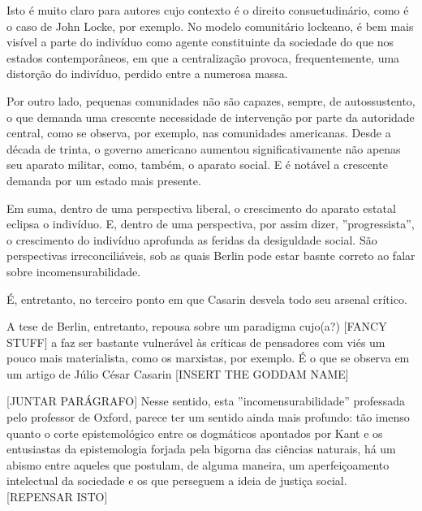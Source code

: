 \documentclass[12pt,a4paper]{article}
\begin{document}
	Isto é muito claro para autores cujo contexto é o direito 
	consuetudinário, como é o caso de John Locke, por exemplo. 
	No modelo comunitário lockeano, é bem mais visível a parte 
	do indivíduo como agente constituinte da sociedade do que nos 
	estados contemporâneos, em que a centralização provoca, 
	frequentemente, uma distorção do indivíduo, perdido entre a 
	numerosa massa. 

	Por outro lado, pequenas comunidades não são capazes, sempre, de 
	autossustento, o que demanda uma crescente necessidade de intervenção 
	por parte da autoridade central, como se observa, por exemplo, nas 
	comunidades americanas. Desde a década de trinta, o governo americano 
	aumentou significativamente não apenas seu aparato militar, como, 
	também, o aparato social. E é notável a crescente demanda por 
	um estado mais presente. 

	Em suma, dentro de uma perspectiva liberal, o crescimento do aparato 
	estatal eclipsa o indivíduo. E, dentro de uma perspectiva, por assim 
	dizer, ”progressista”, o crescimento do indivíduo aprofunda as feridas 
	da desiguldade social. São perspectivas irreconciliáveis, sob as quais 
	Berlin pode estar basnte correto ao falar sobre incomensurabilidade. 

	É, entretanto, no terceiro ponto em que Casarin desvela todo seu 
	arsenal crítico. 

	\newpage

	A tese de Berlin, entretanto, repousa sobre um paradigma cujo(a?)
	[FANCY STUFF] a faz ser bastante vulnerável às críticas de pensadores 
	com viés um pouco mais materialista, como os marxistas, por exemplo. 
	É o que se observa em um artigo de Júlio César Casarin [INSERT THE GODDAM NAME]
	
	[JUNTAR PARÁGRAFO]
	Nesse sentido, esta ”incomensurabilidade” professada pelo professor 
	de Oxford, parece ter um sentido ainda mais profundo: tão imenso  
	quanto o corte epistemológico entre os dogmáticos apontados por Kant 
	e os entusiastas da epistemologia forjada pela bigorna das ciências 
	naturais, há um abismo entre aqueles que postulam, de alguma maneira, 
	um aperfeiçoamento intelectual da sociedade e os que perseguem a ideia 
	de justiça social. [REPENSAR ISTO]
	

	
	
	
\end{document}
